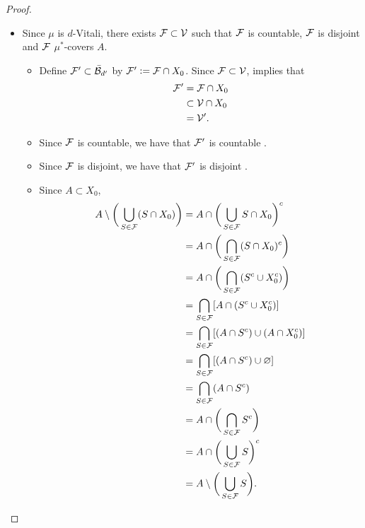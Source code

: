 \documentclass{book}
\begin{document}
\begin{proof}
\begin{enumerate}
\begin{itemize}
				\begin{align*}
					\inf \{r > 0: \bar{B}_d(x, r) \in \MV\} 
					& = \inf \{r > 0: \bar{B}_{d'}(x, r) \in \MV'\} \\
					& = 0.
				\end{align*}
				Since $x \in A$ is arbitrary, we have that for each $x \in A$, $\inf \{r > 0: \bar{B}_d(x, r) \in \MV\} = 0$. Hence $\MV$ is $d$-fine on $A$. 
				\item Since $\mu$ is $d$-Vitali, there exists $\mathcal{F} \subset \mathcal{V}$ such that $\mathcal{F}$ is countable, $\mathcal{F}$ is disjoint and $\mathcal{F}$ $\mu^*$-covers $A$.
				\begin{itemize}
					\item Define $\mathcal{F}' \subset \bar{\mathcal{B}}_{d'}$ by $\mathcal{F}' \vcentcolon= \mathcal{F} \cap X_0$. Since $\mathcal{F} \subset \mathcal{V}$,  implies that 
					\begin{align*}
						\mathcal{F}'
						& = \mathcal{F} \cap X_0 \\
						& \subset \mathcal{V} \cap X_0 \\
						& = \mathcal{V}'.
					\end{align*}
					\item Since $\mathcal{F}$ is countable, we have that $\mathcal{F}'$ is countable .
					\item Since $\mathcal{F}$ is disjoint, we have that $\mathcal{F}'$ is disjoint .
					\item Since $A \subset X_0$, 
					\begin{align*}
						A \setminus \bigg(\bigcup_{S \in \mathcal{F}} (S \cap X_0) \bigg)
						& = A \cap \bigg(\bigcup_{S \in \mathcal{F}} S \cap X_0 \bigg)^c \\
						& = A \cap \bigg(\bigcap_{S \in \mathcal{F}}(S \cap X_0)^c \bigg) \\
						& = A \cap \bigg(\bigcap_{S \in \mathcal{F}}(S^c \cup X_0^c)  \bigg) \\
						& = \bigcap_{S \in \mathcal{F}}[A \cap (S^c \cup X_0^c)] \\
						& = \bigcap_{S \in \mathcal{F}}[(A \cap S^c) \cup (A \cap X_0^c)] \\
						& = \bigcap_{S \in \mathcal{F}}[(A \cap S^c) \cup \varnothing] \\
						& = \bigcap_{S \in \mathcal{F}} (A \cap S^c) \\
						& = A \cap \bigg( \bigcap_{S \in \mathcal{F}} S^c \bigg) \\
						& = A \cap \bigg( \bigcup_{S \in \mathcal{F}} S \bigg)^c \\
						& = A \setminus \bigg( \bigcup_{S \in \mathcal{F}} S  \bigg).
					\end{align*}

\end{itemize}
\end{itemize}
\end{enumerate}
\end{proof}
\end{document}
